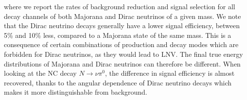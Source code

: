 where we report the rates of background reduction and signal selection for all decay channels of both Majorana and Dirac neutrinos of a given mass.
We note that the Dirac neutrino decays generally have a lower signal efficiency, between 5\% and 10\% less, %
compared to a Majorana state of the same mass.
This is a consequence of certain combinations of production and decay modes which are forbidden for Dirac neutrinos, %
as they would lead to LNV.
The final true energy distributions of Majorana and Dirac neutrinos can therefore be different.
When looking at the NC decay $N\to\nu \pi^0$, the difference in signal efficiency is almost recovered, %
thanks to the angular dependence of Dirac neutrino decays which makes it more distinguishable from background.






